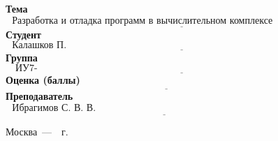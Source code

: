 \begin{titlepage}
	\noindent\textbf{Тема} $\underline{\text{~~Разработка и отладка программ в вычислительном комплексе Тераграф~~~~~~~~~~~~~~}}$\newline\newline
	\noindent\textbf{Студент} $\underline{\text{~~Калашков П. А.~~~~~~~~~~~~~~~~~~~~~~~~~~~~~~~~~~~~~~~~~~~~~~~~~~~~~~~~~~~~~~~~~~~~~~~~~~~~~~~~~~~~~~~~}}$\newline\newline
	\noindent\textbf{Группа} $\underline{\text{~~~ИУ7-56Б~~~~~~~~~~~~~~~~~~~~~~~~~~~~~~~~~~~~~~~~~~~~~~~~~~~~~~~~~~~~~~~~~~~~~~~~~~~~~~~~~~~~~~~~~~~~~~~~~}}$\newline\newline
	\noindent\textbf{Оценка (баллы)} $\underline{\text{~~~~~~~~~~~~~~~~~~~~~~~~~~~~~~~~~~~~~~~~~~~~~~~~~~~~~~~~~~~~~~~~~~~~~~~~~~~~~~~~~~~~~~~~~~~~~~~~~~~}}$\newline\newline
	\noindent\textbf{Преподаватель} $\underline{\text{~~Ибрагимов С. В. В.~~~~~~~~~~~~~~~~~~~~~~~~~~~~~~~~~~~~~~~~~~~~~~~~~~~~~~~~~~~~~~~~~~~~~~}}$\newline
	
	\begin{center}
		\vfill
		Москва~---~\the\year~г.
	\end{center}
	\restoregeometry
\end{titlepage}

